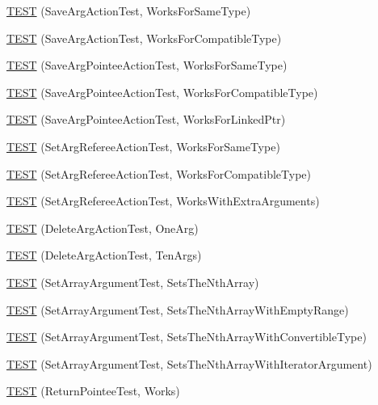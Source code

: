 \begin{DoxyCompactItemize}
\item 
\hyperlink{namespacetesting_1_1gmock__more__actions__test_a511b9c6721629465fd1e2fbd65633ef9}{T\+E\+ST} (Save\+Arg\+Action\+Test, Works\+For\+Same\+Type)
\item 
\hyperlink{namespacetesting_1_1gmock__more__actions__test_a2b92b573de73fdf97dad4da8a67d7fc0}{T\+E\+ST} (Save\+Arg\+Action\+Test, Works\+For\+Compatible\+Type)
\item 
\hyperlink{namespacetesting_1_1gmock__more__actions__test_a51d471708cb6fa3c403ea1d936a49dc1}{T\+E\+ST} (Save\+Arg\+Pointee\+Action\+Test, Works\+For\+Same\+Type)
\item 
\hyperlink{namespacetesting_1_1gmock__more__actions__test_a35b74b32b6a222e048706e6ce8d64118}{T\+E\+ST} (Save\+Arg\+Pointee\+Action\+Test, Works\+For\+Compatible\+Type)
\item 
\hyperlink{namespacetesting_1_1gmock__more__actions__test_afc168d80fe8ca16f0efc874587574e64}{T\+E\+ST} (Save\+Arg\+Pointee\+Action\+Test, Works\+For\+Linked\+Ptr)
\item 
\hyperlink{namespacetesting_1_1gmock__more__actions__test_aa9fa575b30dca09e9886722b78415a22}{T\+E\+ST} (Set\+Arg\+Referee\+Action\+Test, Works\+For\+Same\+Type)
\item 
\hyperlink{namespacetesting_1_1gmock__more__actions__test_af5a15dbcba14010a5463f3ac9451ab8a}{T\+E\+ST} (Set\+Arg\+Referee\+Action\+Test, Works\+For\+Compatible\+Type)
\item 
\hyperlink{namespacetesting_1_1gmock__more__actions__test_a0ea4f3d8f1a643726e37825c58d8741f}{T\+E\+ST} (Set\+Arg\+Referee\+Action\+Test, Works\+With\+Extra\+Arguments)
\item 
\hyperlink{namespacetesting_1_1gmock__more__actions__test_a575e9a6f5bfcc133188e973147697425}{T\+E\+ST} (Delete\+Arg\+Action\+Test, One\+Arg)
\item 
\hyperlink{namespacetesting_1_1gmock__more__actions__test_a972b47a7e96b95606190afa928ea2db4}{T\+E\+ST} (Delete\+Arg\+Action\+Test, Ten\+Args)
\item 
\hyperlink{namespacetesting_1_1gmock__more__actions__test_aacf568e3d16b210aa2316ccc2cb6b22d}{T\+E\+ST} (Set\+Array\+Argument\+Test, Sets\+The\+Nth\+Array)
\item 
\hyperlink{namespacetesting_1_1gmock__more__actions__test_a63a338ef41086b80dba5729ecd1073e5}{T\+E\+ST} (Set\+Array\+Argument\+Test, Sets\+The\+Nth\+Array\+With\+Empty\+Range)
\item 
\hyperlink{namespacetesting_1_1gmock__more__actions__test_a42955fc99954c095f9d7ded3b92c091f}{T\+E\+ST} (Set\+Array\+Argument\+Test, Sets\+The\+Nth\+Array\+With\+Convertible\+Type)
\item 
\hyperlink{namespacetesting_1_1gmock__more__actions__test_a5db6a5413414f6d9bb8a24d1f07bf882}{T\+E\+ST} (Set\+Array\+Argument\+Test, Sets\+The\+Nth\+Array\+With\+Iterator\+Argument)
\item 
\hyperlink{namespacetesting_1_1gmock__more__actions__test_a690ef20bd9c281781eddcf99b18cff6c}{T\+E\+ST} (Return\+Pointee\+Test, Works)
\end{DoxyCompactItemize}
